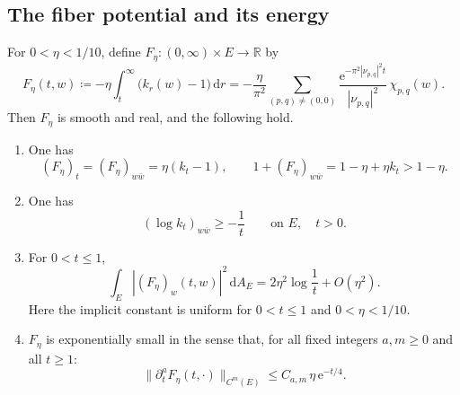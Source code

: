 \documentclass[11pt,a4paper]{article}
\begin{document}
	\subsection{The fiber potential and its energy}
	
	\begin{lemma}
		\label{lem:heat-fiber}
		For $0<\eta<1/10$, define
		$F_\eta\colon(0,\infty)\times E\to\mathbb R$ by
		\begin{equation}
			F_\eta(t,w)\coloneqq -\eta\int_t^\infty\bigl(k_r(w)-1\bigr)\,\mathrm{d}r
			=-\frac{\eta}{\pi^2}
			\sum_{(p,q)\ne(0,0)}
			\frac{\mathrm{e}^{-\pi^2|\nu_{p,q}|^2t}}
			{|\nu_{p,q}|^2}\,\chi_{p,q}(w).
			\label{eq:heat-potential}
		\end{equation}
		Then $F_\eta$ is smooth and real, and the following hold.
		\begin{enumerate}[label={(\arabic*)}]
			\item One has
			\begin{equation}
				(F_\eta)_t=(F_\eta)_{w\bar w}=\eta(k_t-1),
				\qquad
				1+(F_\eta)_{w\bar w}=1-\eta+\eta k_t>1-\eta.
				\label{eq:heat-identity}
			\end{equation}
			\item One has
			\begin{equation}
				(\log k_t)_{w\bar w}\ge-\frac1t
				\qquad\text{on }E,\quad t>0.
				\label{eq:log-heat}
			\end{equation}
			\item For $0<t\le1$,
			\begin{equation}
				\int_E|(F_\eta)_w(t,w)|^2\,\mathrm{d}A_E
				=2\eta^2\log\frac1t+O(\eta^2).
				\label{eq:heat-energy}
			\end{equation}
			Here the implicit constant is uniform for $0<t\le1$ and
			$0<\eta<1/10$.
			\item $F_\eta$ is exponentially small in the sense that, for all fixed integers $a,m\ge0$ and
			all $t\ge1$:
			\begin{equation}
				\|\partial_t^a F_\eta(t,\cdot)\|_{C^m(E)}
				\le C_{a,m}\,\eta\,\mathrm{e}^{-t/4}.
				\label{eq:heat-flat-F}
			\end{equation}
		\end{enumerate}
	\end{lemma}
	
\end{document}
